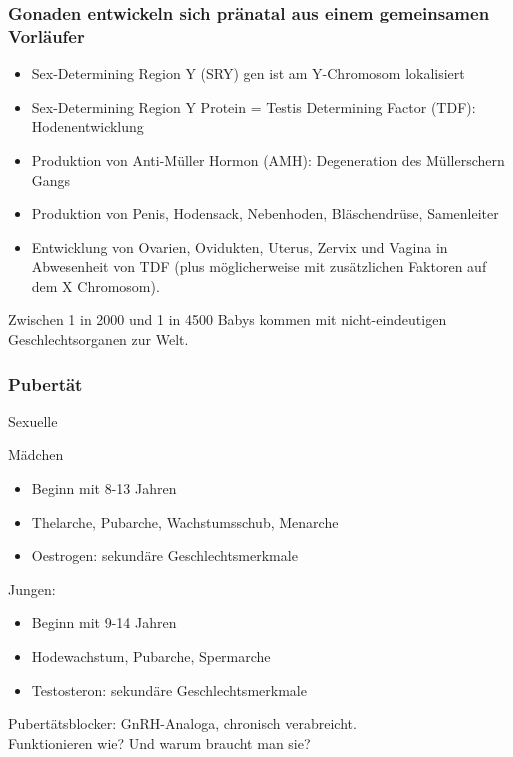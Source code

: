 \documentclass{beamer}
\begin{document}
\begin{frame}
\frametitle{Gonaden entwickeln sich pränatal aus einem gemeinsamen Vorläufer}


\begin{itemize}
    \item 
 Sex-Determining Region Y (SRY) gen ist am Y-Chromosom lokalisiert
   \pause
 \item
 Sex-Determining Region Y Protein = Testis Determining Factor (TDF): Hodenentwicklung
 \pause
 \item
Produktion von Anti-Müller Hormon (AMH): Degeneration des Müllerschern Gangs
\pause
 \item
Produktion  von Penis, Hodensack, Nebenhoden, Bläschendrüse, Samenleiter
\pause
 \item
Entwicklung von Ovarien, Ovidukten, Uterus, Zervix und Vagina in Abwesenheit von TDF (plus möglicherweise mit zusätzlichen Faktoren auf dem X Chromosom). 

\end{itemize}

\pause
Zwischen 1 in 2000 und 1 in 4500 Babys kommen mit nicht-eindeutigen Geschlechtsorganen zur Welt. 

\end{frame}




\begin{frame}

\frametitle{Pubertät}
Sexuelle 

\begin{block}{Mädchen}
\begin{itemize}
\item
Beginn mit 8-13 Jahren
\item
Thelarche, Pubarche, Wachstumsschub, Menarche
\item
Oestrogen: sekundäre Geschlechtsmerkmale
\end{itemize}
\end{block} 

\pause

\begin{block}{Jungen:}
\begin{itemize}
\item
Beginn mit 9-14 Jahren
\item    
Hodewachstum, Pubarche, Spermarche
\item
Testosteron: sekundäre Geschlechtsmerkmale
\end{itemize}
\end{block}

\pause

Pubertätsblocker: GnRH-Analoga, chronisch verabreicht. \\
\textcolor{theme}{Funktionieren wie? Und warum braucht man sie?}

\end{frame}
\end{document}
